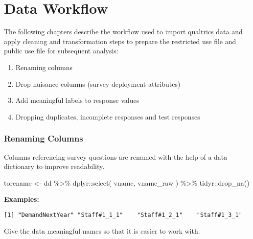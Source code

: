 \documentclass[
  letterpaper,
]{scrbook}
\newenvironment{Shaded}{\begin{snugshade}}{\end{snugshade}}
\newcommand{\FunctionTok}[1]{\textcolor[rgb]{0.28,0.35,0.67}{#1}}
\newcommand{\NormalTok}[1]{\textcolor[rgb]{0.00,0.23,0.31}{#1}}
\newcommand{\OtherTok}[1]{\textcolor[rgb]{0.00,0.23,0.31}{#1}}
\newcommand{\SpecialCharTok}[1]{\textcolor[rgb]{0.37,0.37,0.37}{#1}}
\providecommand{\tightlist}{%
  \setlength{\itemsep}{0pt}\setlength{\parskip}{0pt}}\usepackage{longtable,booktabs,array}
\begin{document}
\part{Data Workflow}

The following chapters describe the workflow used to import qualtrics
data and apply cleaning and transformation steps to prepare the
restricted use file and public use file for subsequent analysis:

\begin{enumerate}
\def\labelenumi{\arabic{enumi}.}
\tightlist
\item
  Renaming columns
\item
  Drop nuisance columns (survey deployment attributes)
\item
  Add meaningful labels to response values
\item
  Dropping duplicates, incomplete responses and test responses
\end{enumerate}

\section*{Renaming Columns}\label{renaming-columns}


Columns referencing survey questions are renamed with the help of a data
dictionary to improve readability.

\begin{Shaded}
\begin{Highlighting}[]
\NormalTok{torename }\OtherTok{\textless{}{-}} 
\NormalTok{  dd }\SpecialCharTok{\%\textgreater{}\%} 
\NormalTok{  dplyr}\SpecialCharTok{::}\FunctionTok{select}\NormalTok{( vname, vname\_raw ) }\SpecialCharTok{\%\textgreater{}\%} 
\NormalTok{  tidyr}\SpecialCharTok{::}\FunctionTok{drop\_na}\NormalTok{()}
\end{Highlighting}
\end{Shaded}

\textbf{Examples:}

\begin{verbatim}
[1] "DemandNextYear" "Staff#1_1_1"    "Staff#1_2_1"    "Staff#1_3_1"   
\end{verbatim}

Give the data meaningful names so that it is easier to work with.

\begin{Shaded}
\end{Shaded}
\end{document}
